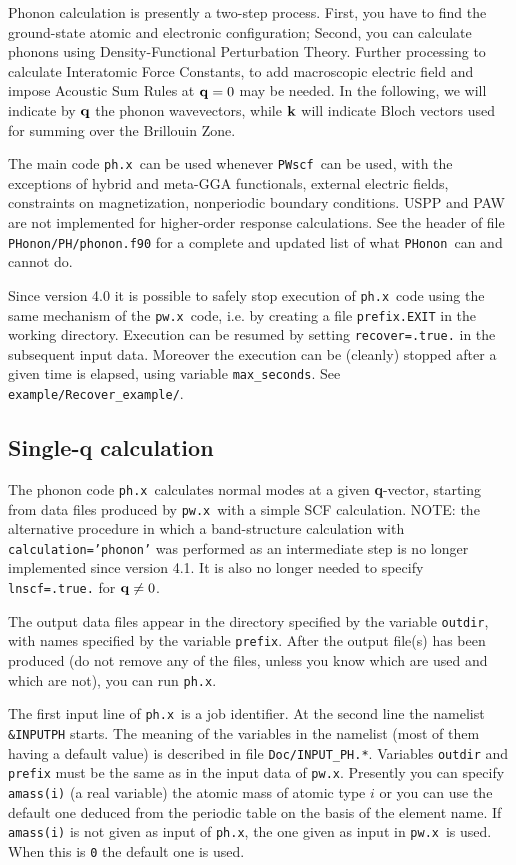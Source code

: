 \documentclass[12pt,a4paper]{article}
\def\pwx{\texttt{pw.x}}
\def\phx{\texttt{ph.x}}
\def\PWscf{\texttt{PWscf}}
\def\PHonon{\texttt{PHonon}}
\begin{document}
Phonon calculation is presently a two-step process.
First, you have to find the ground-state atomic and electronic configuration;
Second, you can calculate phonons using Density-Functional Perturbation Theory.
Further processing to calculate Interatomic Force Constants, to add macroscopic
electric field and impose Acoustic Sum Rules at ${\bf q}=0$ may be needed.
In the following, we will indicate by ${\bf q}$ the phonon wavevectors, 
while ${\bf k}$ will indicate Bloch vectors used for summing over the 
Brillouin Zone.

The main code \phx\ can be used whenever \PWscf\ can be used, with the
exceptions of hybrid and meta-GGA functionals, external electric fields,
constraints on magnetization, nonperiodic boundary conditions.
USPP and PAW are not implemented for higher-order response calculations.
See the header of file \texttt{PHonon/PH/phonon.f90} for a complete and
updated list of what \PHonon\ can and cannot do.

Since version 4.0 it is possible to safely stop execution of \phx\ code using
the same mechanism of the \pwx\ code, i.e. by creating a file 
\texttt{prefix.EXIT} in the working directory. Execution can be resumed by 
setting \texttt{recover=.true.} in the subsequent input data.
Moreover the execution can be (cleanly) stopped after a given time is elapsed,
using variable \texttt{max\_seconds}. See \texttt{example/Recover\_example/}.

\subsection{Single-{\bf q} calculation}

The phonon code \phx\ calculates normal modes at a given {\bf q}-vector, 
starting from data files produced by \pwx\ with a simple SCF calculation.
NOTE: the alternative procedure in which a band-structure calculation 
with \texttt{calculation='phonon'} was performed as an intermediate step is no
longer implemented since version 4.1. It is also no longer needed to
specify \texttt{lnscf=.true.} for ${\bf q}\ne 0$.

The output data files appear in the directory specified by the
variable {\tt outdir}, with names specified by the variable 
{\tt prefix}. After the output file(s) has been produced (do not remove 
any of the files, unless you know which are used and which are not), 
you can run \phx.
    
The first input line of \phx\ is a job identifier. At the second line the
namelist {\tt \&INPUTPH} starts. The meaning of the variables in the namelist
(most of them having a default value) is described in file 
\texttt{Doc/INPUT\_PH.*}. Variables \texttt{outdir} and \texttt{prefix} 
must be the same as in the input data of \pwx. Presently
you can specify \texttt{amass(i)} (a real variable) the atomic mass 
of atomic type $i$ or you can use the default one deduced from the
periodic table on the basis of the element name. If 
{\tt amass(i)} is not given as input of \phx, the one given as
input in \pwx\ is used. When this is {\tt 0} the default one is used.
\end{document}
